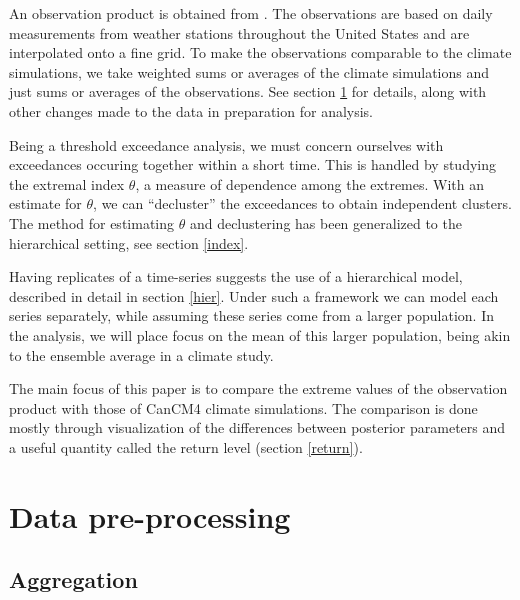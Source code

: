 \documentclass[12pt]{article}
\begin{document}
An observation product is obtained from \cite{maurer2002long}. The observations are based on daily measurements from weather stations throughout the United States and are interpolated onto a fine grid. To make the observations comparable to the climate simulations, we take weighted sums or averages of the climate simulations and just sums or averages of the observations. See section \ref{process} for details, along with other changes made to the data in preparation for analysis.

Being a threshold exceedance analysis, we must concern ourselves with exceedances occuring together within a short time. This is handled by studying the extremal index $\theta$, a measure of dependence among the extremes. With an estimate for $\theta$, we can ``decluster'' the exceedances to obtain independent clusters. The method for estimating $\theta$ and declustering has been generalized to the hierarchical setting, see section \ref{index}.

Having replicates of a time-series suggests the use of a hierarchical model, described in detail in section \ref{hier}. Under such a framework we can model each series separately, while assuming these series come from a larger population. In the analysis, we will place focus on the mean of this larger population, being akin to the ensemble average in a climate study.

The main focus of this paper is to compare the extreme values of the observation product with those of CanCM4 climate simulations. The comparison is done mostly through visualization of the differences between posterior parameters and a useful quantity called the return level (section \ref{return}).



\section{Data pre-processing}
\label{process}

\subsection{Aggregation}
\label{aggregate}
\end{document}
